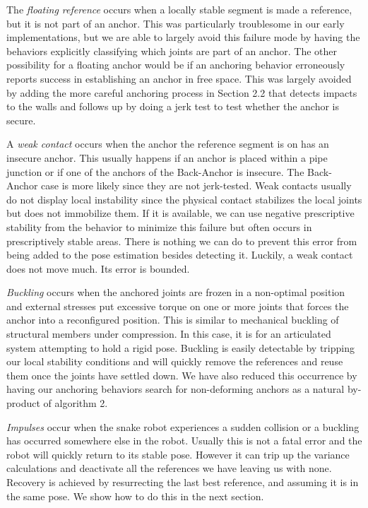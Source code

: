 The \emph{floating reference} occurs when a locally stable segment is made a reference, but it is not part of an anchor. This was particularly troublesome in our early implementations, but we are able to largely avoid this failure mode by having the behaviors explicitly classifying which joints are part of an anchor. The other possibility for a floating anchor would be if an anchoring behavior erroneously reports success in establishing an anchor in free space. This was largely avoided by adding the more careful anchoring process in Section 2.2 that detects impacts to the walls and follows up by doing a jerk test to test whether the anchor is secure.

A \emph{weak contact} occurs when the anchor the reference segment is on has an insecure anchor. This usually happens if an anchor is placed within a pipe junction or if one of the anchors of the Back-Anchor is insecure. The Back-Anchor case is more likely since they are not jerk-tested. Weak contacts usually do not display local instability since the physical contact stabilizes the local joints but does not immobilize them. If it is available, we can use negative prescriptive stability from the behavior to minimize this failure but often occurs in prescriptively stable areas. There is nothing we can do to prevent this error from being added to the pose estimation besides detecting it. Luckily, a weak contact does not move much. Its error is bounded.

\emph{Buckling} occurs when the anchored joints are frozen in a non-optimal position and external stresses put excessive torque on one or more joints that forces the anchor into a reconfigured position. This is similar to mechanical buckling of structural members under compression. In this case, it is for an articulated system attempting to hold a rigid pose. Buckling is easily detectable by tripping our local stability conditions and will quickly remove the references and reuse them once the joints have settled down. We have also reduced this occurrence by having our anchoring behaviors search for non-deforming anchors as a natural by-product of algorithm 2.

\emph{Impulses} occur when the snake robot experiences a sudden collision or a buckling has occurred somewhere else in the robot. Usually this is not a fatal error and the robot will quickly return to its stable pose. However it can trip up the variance calculations and deactivate all the references we have leaving us with none. Recovery is achieved by resurrecting the last best reference, and assuming it is in the same pose. We show how to do this in the next section.

